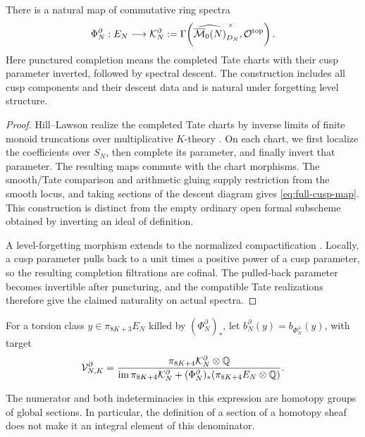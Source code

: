 \begin{proposition}\label{prop:full-cusp-map}
There is a natural map of commutative ring spectra
\begin{equation}\label{eq:full-cusp-map}
 \Phi_N^\partial:E_N\longrightarrow\mathcal K_N^\partial
 :=\Gamma\!\left(\widehat{\overline{\mathcal M}_0(N)}_{D_N}^{\,\times},
                    \mathcal O^{\mathrm{top}}\right).
\end{equation}
Here punctured completion means the completed Tate charts with their
cusp parameter inverted, followed by spectral descent. The construction
includes all cusp components and their descent data and is natural
under forgetting level structure.
\end{proposition}
\begin{proof}
Hill--Lawson realize the completed Tate charts by inverse limits of
finite monoid truncations over multiplicative $K$-theory
\cite[Section~5.1, Theorem~5.7 and Corollary~5.8]{HL}. On each chart,
we first localize the coefficients over $S_N$, then complete its
parameter, and finally invert that parameter. The resulting maps
commute with the chart morphisms. The smooth/Tate comparison and
arithmetic gluing
\cite[Propositions~5.9 and~5.12, Section~5.3]{HL} supply restriction
from the smooth locus, and taking sections of the descent diagram gives
\eqref{eq:full-cusp-map}. This construction is distinct from the empty
ordinary open formal subscheme obtained by inverting an ideal of
definition.

A level-forgetting morphism extends to the normalized compactification
\cite[Proposition~3.19 and Theorem~6.1]{HL}. Locally, a cusp parameter
pulls back to a unit times a positive power of a cusp parameter, so the
resulting completion filtrations are cofinal. The pulled-back parameter
becomes invertible after puncturing, and the compatible Tate
realizations therefore give the claimed naturality on actual spectra.
\end{proof}

\begin{definition}\label{def:full-cusp}
For a torsion class $y\in\pi_{8K+3}E_N$ killed by
$(\Phi_N^\partial)_*$, let $b_N^\partial(y)=b_{\Phi_N^\partial}(y)$,
with target
\begin{equation}\label{eq:joint-value}
 \mathcal V_{N,K}^\partial=
 \frac{\pi_{8K+4}\mathcal K_N^\partial\otimes\mathbb Q}
 {\operatorname{im}\pi_{8K+4}\mathcal K_N^\partial+
  (\Phi_N^\partial)_*(\pi_{8K+4}E_N\otimes\mathbb Q)}.
\end{equation}
\end{definition}
The numerator and both indeterminacies in this expression are homotopy
groups of global sections. In particular, the definition of a section
of a homotopy sheaf does not make it an integral element of this
denominator.

